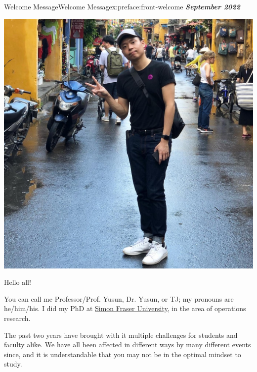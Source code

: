 \documentclass[oneside,10pt,]{book}
\newcommand{\alert}[1]{\textbf{\textit{#1}}}
\numberwithin{equation}{section}
\begin{document}
\par\medskip
{}
\null\clearpage
%
%
\typeout{************************************************}
\typeout{************************************************}
%
\begin{preface}{Welcome Message}{}{Welcome Message}{}{}{x:preface:front-welcome}
\alert{September 2022}%
\begin{sidebyside}{1}{0.15}{0.15}{0}%
\begin{sbspanel}{0.7}%
\includegraphics[width=\linewidth]{figs/TJ.jpg}
\end{sbspanel}%
\end{sidebyside}%
\par
Hello all!%
\par
You can call me Professor\slash{}Prof. Yusun, Dr. Yusun, or TJ; my pronouns are he\slash{}him\slash{}his. I did my PhD at \href{https://sfu.ca}{Simon Fraser University}, in the area of operations research.%
\par
The past two years have brought with it multiple challenges for students and faculty alike. We have all been affected in different ways by many different events since, and it is understandable that you may not be in the optimal mindset to study.%
\begin{sidebyside}{1}{0.15}{0.15}{0}%

\end{sidebyside}
\end{preface}
\end{document}
